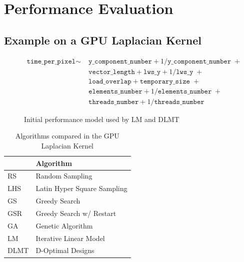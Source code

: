\documentclass[conference]{IEEEtran}
\begin{document}
\section{Performance Evaluation}
\label{sec:orgdc80fb2}
\subsection{Example on a GPU Laplacian Kernel}
\label{sec:org072f46f}
\begin{figure}
{\scriptsize
\begin{align*}
\texttt{time\_per\_pixel} \sim & \; \texttt{y\_component\_number} + 1 / \texttt{y\_component\_number} \; + \\
& \; \texttt{vector\_length} + \texttt{lws\_y} + 1 / \texttt{lws\_y} \; + \\
& \; \texttt{load\_overlap} + \texttt{temporary\_size} \; + \\
& \; \texttt{elements\_number} + 1 / \texttt{elements\_number} \; + \\
& \; \texttt{threads\_number} + 1 /\texttt{threads\_number}
\end{align*}
}
\caption{Initial performance model used by LM and DLMT}
\end{figure}

\begin{table}[ht]
\caption{Algorithms compared in the GPU Laplacian Kernel}
\centering
\footnotesize
\begin{tabular}{ll}
\toprule
 & Algorithm\\
\midrule
RS & Random Sampling\\
LHS & Latin Hyper Square Sampling\\
GS & Greedy Search\\
GSR & Greedy Search w/ Restart\\
GA & Genetic Algorithm\\
LM & Iterative Linear Model\\
DLMT & D-Optimal Designs\\
\bottomrule
\end{tabular}
\end{table}
\end{document}
